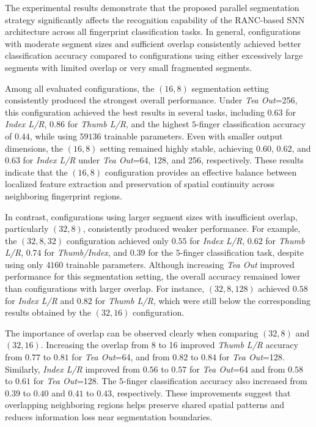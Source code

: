 \documentclass[../main.tex]{subfiles}
\begin{document}
The experimental results demonstrate that the proposed parallel segmentation strategy significantly affects the recognition capability of the RANC-based SNN architecture across all fingerprint classification tasks. In general, configurations with moderate segment sizes and sufficient overlap consistently achieved better classification accuracy compared to configurations using either excessively large segments with limited overlap or very small fragmented segments.

Among all evaluated configurations, the $(16,8)$ segmentation setting consistently produced the strongest overall performance. Under \textit{Tea Out}=256, this configuration achieved the best results in several tasks, including $0.63$ for \textit{Index L/R}, $0.86$ for \textit{Thumb L/R}, and the highest $5$-finger classification accuracy of $0.44$, while using $59136$ trainable parameters. Even with smaller output dimensions, the $(16,8)$ setting remained highly stable, achieving $0.60$, $0.62$, and $0.63$ for \textit{Index L/R} under \textit{Tea Out}=64, 128, and 256, respectively. These results indicate that the $(16,8)$ configuration provides an effective balance between localized feature extraction and preservation of spatial continuity across neighboring fingerprint regions.

In contrast, configurations using larger segment sizes with insufficient overlap, particularly $(32,8)$, consistently produced weaker performance. For example, the $(32,8,32)$ configuration achieved only $0.55$ for \textit{Index L/R}, $0.62$ for \textit{Thumb L/R}, $0.74$ for \textit{Thumb/Index}, and $0.39$ for the $5$-finger classification task, despite using only $4160$ trainable parameters. Although increasing \textit{Tea Out} improved performance for this segmentation setting, the overall accuracy remained lower than configurations with larger overlap. For instance, $(32,8,128)$ achieved $0.58$ for \textit{Index L/R} and $0.82$ for \textit{Thumb L/R}, which were still below the corresponding results obtained by the $(32,16)$ configuration.

The importance of overlap can be observed clearly when comparing $(32,8)$ and $(32,16)$. Increasing the overlap from 8 to 16 improved \textit{Thumb L/R} accuracy from $0.77$ to $0.81$ for \textit{Tea Out}=64, and from $0.82$ to $0.84$ for \textit{Tea Out}=128. Similarly, \textit{Index L/R} improved from $0.56$ to $0.57$ for \textit{Tea Out}=64 and from $0.58$ to $0.61$ for \textit{Tea Out}=128. The $5$-finger classification accuracy also increased from $0.39$ to $0.40$ and $0.41$ to $0.43$, respectively. These improvements suggest that overlapping neighboring regions helps preserve shared spatial patterns and reduces information loss near segmentation boundaries.
\end{document}
